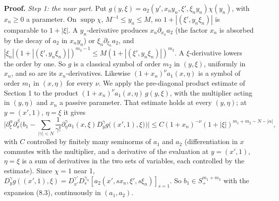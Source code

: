\documentclass[
  11pt,
]{article}
\begin{document}
\textbf{Proof.} \emph{Step 1: the near part.} Put
\(g(y,\xi)=a_2(y',x_ny_n,\xi',\xi_ny_n)\chi(y_n)\), with \(x_n\geq0\) a
parameter. On \(\operatorname{supp}\chi\), \(M^{-1}\leq y_n\leq M\), so
\(1+|(\xi',y_n\xi_n)|\) is comparable to \(1+|\xi|\). A
\(y_n\)-derivative produces \(x_n\partial_{x_n}a_2\) (the factor \(x_n\)
is absorbed by the decay of \(a_2\) in \(x_ny_n\)) or
\(\xi_n\partial_{\xi_n}a_2\), and
\(|\xi_n|(1+|(\xi',y_n\xi_n)|)^{m_2-1}\leq M(1+|(\xi',y_n\xi_n)|)^{m_2}\).
A \(\xi\)-derivative lowers the order by one. So \(g\) is a classical
symbol of order \(m_2\) in \((y,\xi)\), uniformly in \(x_n\), and so are
its \(x_n\)-derivatives. Likewise \((1+x_n)^\nu a_1(x,\eta)\) is a
symbol of order \(m_1\) in \((x,\eta)\) for every \(\nu\). We apply the
pre-diagonal product estimate of Section 1 to the product
\((1+x_n)^\nu a_1(x,\eta)\,g(y,\xi)\), with the multiplier acting in
\((y,\eta)\) and \(x_n\) a passive parameter. That estimate holds at
every \((y,\eta)\); at \(y=(x',1)\), \(\eta=\xi\) it gives \[
\Big|\partial^\alpha_\xi\partial^\beta_x\Big(b_1-\sum_{|\gamma|<N}\frac1{\gamma!}\partial^\gamma_\eta a_1(x,\xi)D_y^\gamma g\big((x',1),\xi\big)\Big)\Big|\leq C(1+x_n)^{-\nu}(1+|\xi|)^{m_1+m_2-N-|\alpha|},
\] with \(C\) controlled by finitely many seminorms of \(a_1\) and
\(a_2\) (differentiation in \(x\) commutes with the multiplier, and a
derivative of the evaluation at \(y=(x',1)\), \(\eta=\xi\) is a sum of
derivatives in the two sets of variables, each controlled by the
estimate). Since \(\chi=1\) near 1,
\(D_y^\gamma g((x',1),\xi)=D^{\gamma'}_{x'}D^{\gamma_n}_s[a_2(x',sx_n,\xi',s\xi_n)]_{s=1}\).
So \(b_1\in S^{m_1+m_2}_+\) with the expansion (8.3), continuously in
\((a_1,a_2)\).
\end{document}
